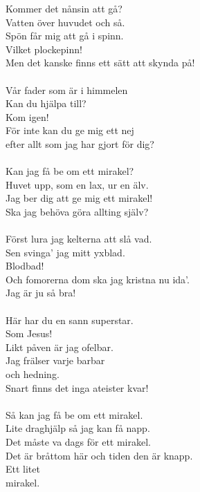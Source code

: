 \documentclass[a6paper, 10pt, twoside]{article}
\begin{document}
\begin{center}
\end{center}
\begin{lyrics}
Kommer det nånsin att gå? \\
Vatten över huvudet och så. \\
Spön får mig att gå i spinn. \\
Vilket plockepinn! \\
Men det kanske finns ett sätt att skynda på! \\
\\
Vår fader som är i himmelen\\
Kan du hjälpa till?\\
Kom igen!\\
För inte kan du ge mig ett nej\\
efter allt som jag har gjort för dig? \\
\\
Kan jag få be om ett mirakel?\\
Huvet upp, som en lax, ur en älv. \\
Jag ber dig att ge mig ett mirakel! \\
Ska jag behöva göra allting själv?\\
\\
Först lura jag kelterna att slå vad.\\
Sen svinga’ jag mitt yxblad. \\
Blodbad! \\
Och fomorerna dom ska jag kristna nu ida’. \\
Jag är ju så bra! \\
\\
Här har du en sann superstar. \\
Som Jesus! \\
Likt påven är jag ofelbar. \\
Jag frälser varje barbar \\
och hedning.\\
Snart finns det inga ateister kvar! \\
\\
Så kan jag få be om ett mirakel. \\
Lite draghjälp så jag kan få napp. \\
Det måste va dags för ett mirakel. \\
Det är bråttom här och tiden den är knapp. \\
Ett litet \\
mirakel. \\

\end{lyrics}
\end{document}
